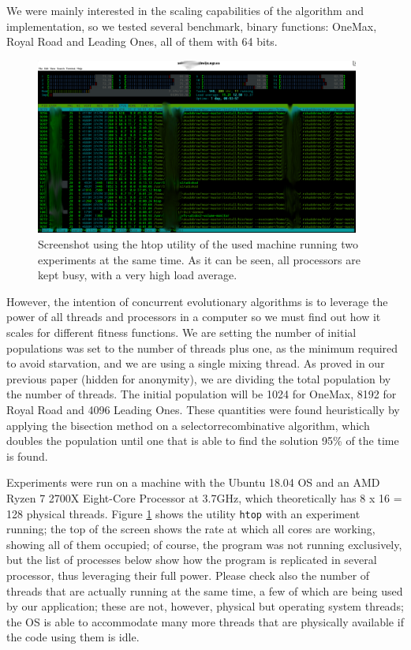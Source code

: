 \documentclass[runningheads]{llncs}\usepackage[]{graphicx}\usepackage[]{color}
\begin{document}
We were mainly interested in the scaling capabilities of the algorithm
and implementation, so we tested several benchmark, binary functions:
OneMax, Royal Road and Leading Ones, all of them with 64 bits. 




\begin{figure}[h!tb]
  \centering
\includegraphics[width=0.95\textwidth]{../figure/screenshot}
\caption{Screenshot using the htop utility of the used machine running
  two experiments at the same time. As it can be seen, all processors
  are kept busy, with a very high load average. }
\label{fig:screenshot}
\end{figure}
%
However, the intention of concurrent evolutionary algorithms is to
leverage the power of all threads and processors in a computer so we must find out how it scales for different fitness functions. We are setting the number of initial populations was set to the
number of threads plus one, as the minimum required to avoid
starvation, and we are using a single mixing thread. As proved in our previous paper (hidden for anonymity), we are dividing the total population by the number of threads. The initial population will be 1024 for OneMax, 8192 for Royal Road and 4096 Leading Ones. These quantities were found heuristically by applying the bisection method on a selectorrecombinative algorithm, which doubles the population until one that is able to find the solution 95\% of the time is found.

Experiments were run on a machine with the
Ubuntu 18.04 OS and an AMD Ryzen 7 2700X Eight-Core Processor
at 3.7GHz, which theoretically has 8 x 16 = 128 physical
threads. Figure \ref{fig:screenshot} shows the utility  {\tt htop} with an 
experiment running; the top of the screen shows the rate at which all
cores are working, showing all of them occupied; of course, the
program was not running exclusively, but the list of processes below
show how the program is replicated in several processor, thus
leveraging their full power. Please check also the number of threads
that are actually running at the same time, a few of which are being used by our application; these are not, however, physical but operating system threads; the OS is able to accommodate many more threads that are physically available if the code using them is idle. 
\end{document}
